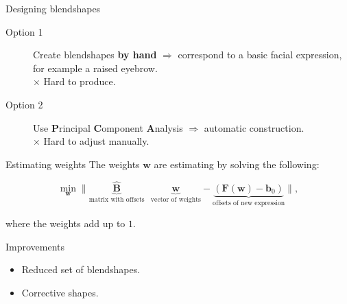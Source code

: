 \documentclass{beamer}
\newcommand{\w}{\mathbf{w}}
\newcommand{\F}{\mathbf{F}}
\newcommand{\bb}{\mathbf{b}}
\begin{document}
\begin{frame}{Designing blendshapes}
\begin{description}
	\item[Option 1] Create blendshapes \textbf{by hand} $\Rightarrow$ correspond to a basic facial expression, for example a raised eyebrow.\\
					$\times$  Hard to produce. \vspace{0.5 cm}
	\item[Option 2] Use \textbf{P}rincipal \textbf{C}omponent \textbf{A}nalysis $\Rightarrow$ automatic construction. \\
					$\times$  Hard to adjust manually.
\end{description}

\end{frame}


\begin{frame}{Estimating weights}
The weights $\w$ are estimating by solving the following:


\begin{minipage}[t]{0.95\linewidth} 
\begin{tcolorbox}[colback=gray!5,colframe=jvagreen, title=Minimisation problem]
\begin{equation*}
	\min_\w \| \underbrace{\hat{\mathbf{B}}}_{\text{matrix with offsets}} \: \: \: \underbrace{\w}_{\text{vector of weights}} - \underbrace{(\F(\w) - \bb_0)}_{\text{offsets of new expression}} \|,
\end{equation*}        
\end{tcolorbox} 
\end{minipage}  \vspace{0.5 cm}

where the weights add up to $1$.

\end{frame}

\begin{frame}{Improvements}
\begin{itemize}
	\item Reduced set of blendshapes.
	\item Corrective shapes.
\end{itemize}

\end{frame}
\end{document}
